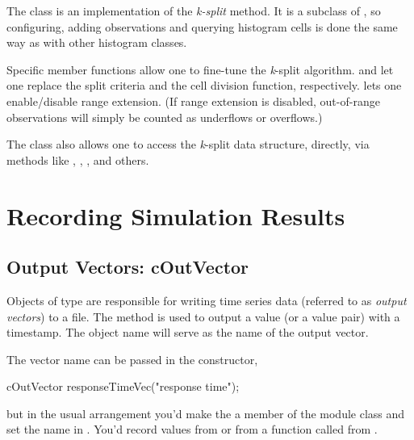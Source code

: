 The  class is an implementation of the \textit{k-split}
method. It is a subclass of , so configuring,
adding observations and querying histogram cells is done the same way as
with other histogram classes.

Specific member functions allow one to fine-tune the \textit{k}-split
algorithm.  and  let one replace
the split criteria and the cell division function, respectively.
 lets one enable/disable range extension. (If
range extension is disabled, out-of-range observations will simply be
counted as underflows or overflows.)

The class also allows one to access the \textit{k}-split data structure,
directly, via methods like , ,
, and others.



\section{Recording Simulation Results}
\label{sec:sim-lib:result-recording}

\subsection{Output Vectors: cOutVector}
\label{sec:sim-lib:coutvector}

Objects of type  are responsible for writing time series
data (referred to as \textit{output vectors}) to a file. The 
method is used to output a value (or a value pair) with a timestamp.
The object name will serve as the name of the output vector.

The vector name can be passed in the constructor,

\begin{cpp}
cOutVector responseTimeVec("response time");
\end{cpp}

but in the usual arrangement you'd make the  a member
of the module class and set the name in . You'd
record values from  or from a function called from
.

